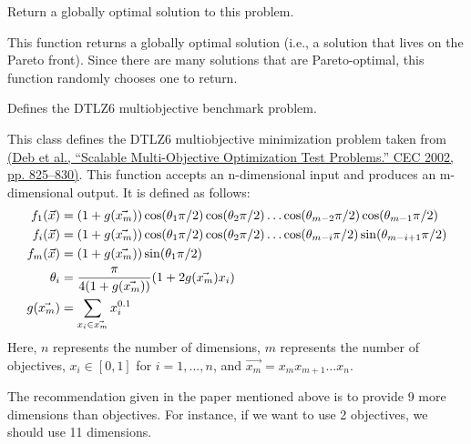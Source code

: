 \documentclass[letterpaper,10pt,english]{sphinxmanual}
\begin{document}
\begin{fulllineitems}
\begin{fulllineitems}
\label{reference:inspyred.benchmarks.DTLZ5.global_optimum}
Return a globally optimal solution to this problem.

This function returns a globally optimal solution (i.e., a 
solution that lives on the Pareto front). Since there are many
solutions that are Pareto-optimal, this function randomly 
chooses one to return.

\end{fulllineitems}


\end{fulllineitems}


\begin{fulllineitems}
\label{reference:inspyred.benchmarks.DTLZ6}
Defines the DTLZ6 multiobjective benchmark problem.

This class defines the DTLZ6 multiobjective minimization problem
taken from \href{http://www.tik.ee.ethz.ch/sop/download/supplementary/testproblems/dtlz1/index.php}{(Deb et al., ``Scalable Multi-Objective Optimization Test Problems.''
CEC 2002, pp. 825--830)}.
This function accepts an n-dimensional input and produces an m-dimensional output.
It is defined as follows:
\begin{gather}
\begin{split}f_1(\vec{x}) &= (1 + g(\vec{x_m}))\cos(\theta_1 \pi/2)\cos(\theta_2 \pi/2)\dots\cos(\theta_{m-2} \pi/2)\cos(\theta_{m-1} \pi/2) \\
f_i(\vec{x}) &= (1 + g(\vec{x_m}))\cos(\theta_1 \pi/2)\cos(\theta_2 \pi/2)\dots\cos(\theta_{m-i} \pi/2)\sin(\theta_{m-i+1} \pi/2) \\
f_m(\vec{x}) &= (1 + g(\vec{x_m}))\sin(\theta_1 \pi/2) \\
\theta_i     &= \frac{\pi}{4(1+g(\vec{x_m}))}(1 + 2g(\vec{x_m}) x_i) \\
g(\vec{x_m}) &= \sum_{x_i \in \vec{x_m}}x_i^{0.1} \\\end{split}\notag
\end{gather}
Here, $n$ represents the number of dimensions, $m$ represents the
number of objectives, $x_i \in [0, 1]$ for $i=1,...,n$, and 
$\vec{x_m} = x_m x_{m+1} \dots x_{n}.$

The recommendation given in the paper mentioned above is to provide 9 more
dimensions than objectives. For instance, if we want to use 2 objectives, we
should use 11 dimensions.


\end{fulllineitems}
\end{document}
